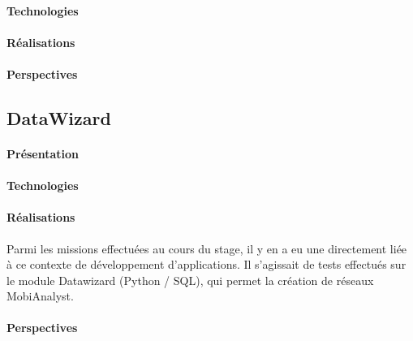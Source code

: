 \paragraph{Technologies}

\paragraph{Réalisations}

\paragraph{Perspectives}

\subsection{DataWizard}

\paragraph{Présentation}

\paragraph{Technologies}

\paragraph{Réalisations}
Parmi les missions effectuées au cours du stage, il y en a eu une directement liée à ce contexte de développement d’applications. Il s’agissait de tests effectués sur le module Datawizard (Python / SQL), qui permet la création de réseaux MobiAnalyst.\\

\paragraph{Perspectives}
